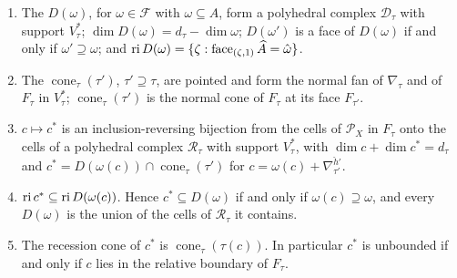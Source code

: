 \begin{lemma}\label{lem:onefacet}
\begin{enumerate}
\item The $D(\omega)$, for $\omega\in\mathcal F$ with $\omega\subseteq A$, form a polyhedral complex $\mathcal D_\tau$ with
support $V_\tau^*$; $\dim D(\omega)=d_\tau-\dim\omega$; $D(\omega')$ is a face of $D(\omega)$ if and only if
$\omega'\supseteq\omega$; and $\operatorname{ri} D(\omega)=\{\zeta:\operatorname{face}_{(\zeta,1)}\widehat A=\hat\omega\}$.
\item The $\operatorname{cone}_\tau(\tau')$, $\tau'\supseteq\tau$, are pointed and form the normal fan of $\nabla_\tau$ and of
$F_\tau$ in $V_\tau^*$; $\operatorname{cone}_\tau(\tau')$ is the normal cone of $F_\tau$ at its face $F_{\tau'}$.
\item $c\mapsto c^*$ is an inclusion-reversing bijection from the cells of $\mathscr P_X$ in $F_\tau$ onto the cells of a
polyhedral complex $\mathcal R_\tau$ with support $V_\tau^*$, with $\dim c+\dim c^*=d_\tau$ and
$c^*=D(\omega(c))\cap\operatorname{cone}_\tau(\tau')$ for $c=\omega(c)+\nabla^{\check h'}_{\tau'}$.
\item $\operatorname{ri} c^*\subseteq\operatorname{ri} D(\omega(c))$. Hence $c^*\subseteq D(\omega)$ if and only if $\omega(c)\supseteq\omega$, and
every $D(\omega)$ is the union of the cells of $\mathcal R_\tau$ it contains.
\item The recession cone of $c^*$ is $\operatorname{cone}_\tau(\tau(c))$. In particular $c^*$ is unbounded if and only if $c$
lies in the relative boundary of $F_\tau$.
\end{enumerate}
\end{lemma}
